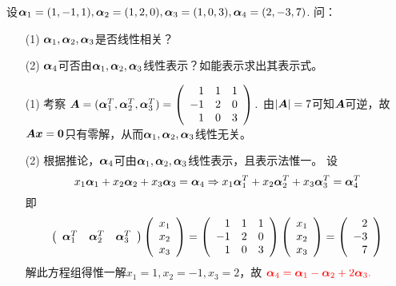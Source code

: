 \begin{li}
  设$\boldsymbol{\alpha}_1=(1,-1,1),\boldsymbol{\alpha}_2=(1,2,0),\boldsymbol{\alpha}_3=(1,0,3),\boldsymbol{\alpha}_4=(2,-3,7)$.
  问：
  \begin{itemize}
  \item[(1)]$\boldsymbol{\alpha}_1,\boldsymbol{\alpha}_2,\boldsymbol{\alpha}_3$是否线性相关？
  \item[(2)]$\boldsymbol{\alpha}_4$可否由$\boldsymbol{\alpha}_1,\boldsymbol{\alpha}_2,\boldsymbol{\alpha}_3$线性表示？如能表示求出其表示式。
  \end{itemize}
\end{li}
\begin{jie}
\begin{itemize}
\item[(1)]    考察
  $
  \boldsymbol{A} = (\boldsymbol{\alpha}_1^T, \boldsymbol{\alpha}_2^T, \boldsymbol{\alpha}_3^T) = \left(
  \begin{array}{rrr}
    1&1&1\\
    -1&2&0\\
    1&0&3
  \end{array}
  \right). 
  $ \quad
  由$|\boldsymbol{A}|=7$可知$\boldsymbol{A}$可逆，故$\boldsymbol{A}{\boldsymbol{x}}=\boldsymbol{0}$只有零解，从而$\boldsymbol{\alpha}_1,\boldsymbol{\alpha}_2,\boldsymbol{\alpha}_3$线性无关。  
\item[(2)] 根据推论，$\boldsymbol{\alpha}_4$可由$\boldsymbol{\alpha}_1,\boldsymbol{\alpha}_2,\boldsymbol{\alpha}_3$线性表示，且表示法惟一。  设
  $$
  x_1\boldsymbol{\alpha}_1+x_2\boldsymbol{\alpha}_2+x_3\boldsymbol{\alpha}_3=\boldsymbol{\alpha}_4   \Rightarrow
  x_1\boldsymbol{\alpha}_1^T+x_2\boldsymbol{\alpha}_2^T+x_3\boldsymbol{\alpha}_3^T=\boldsymbol{\alpha}_4^T       
  $$
  即$$
  \left(
  \begin{array}{ccc}
    \boldsymbol{\alpha}_1^T &\boldsymbol{\alpha}_2^T& \boldsymbol{\alpha}_3^T  
  \end{array}
  \right) \left(
  \begin{array}{c}
    x_1\\
    x_2\\
    x_3
  \end{array}
  \right)= 
  \left(
  \begin{array}{rrr}
    1&1&1\\
    -1&2&0\\
    1&0&3
  \end{array}
  \right) \left(
  \begin{array}{c}
    x_1\\
    x_2\\
    x_3
  \end{array}
  \right) =  \left(
  \begin{array}{r}
    2\\
    -3\\
    7
  \end{array}
  \right)
  $$  
  解此方程组得惟一解$x_1=1,x_2=-1,x_3=2$，故
  $
  \textcolor{red}{\boldsymbol{\alpha}_4=\boldsymbol{\alpha}_1-\boldsymbol{\alpha}_2+2\boldsymbol{\alpha}_3.}
  $
\end{itemize}
\end{jie}






